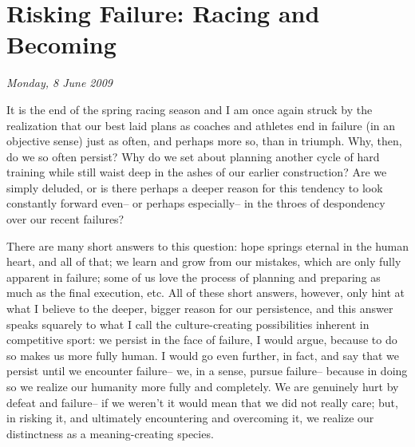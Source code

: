 \chapter{Risking Failure: Racing and Becoming}
\textit{Monday, 8 June 2009}
\bigskip

It is the end of the spring racing season and I am once again struck by the realization that our best laid plans as coaches and athletes end in failure (in an objective sense) just as often, and perhaps more so, than in triumph. Why, then, do we so often persist? Why do we set about planning another cycle of hard training while still waist deep in the ashes of our earlier construction? Are we simply deluded, or is there perhaps a deeper reason for this tendency to look constantly forward even-- or perhaps especially-- in the throes of despondency over our recent failures?

There are many short answers to this question: hope springs eternal in the human heart, and all of that; we learn and grow from our mistakes, which are only fully apparent in failure; some of us love the process of planning and preparing as much as the final execution, etc. All of these short answers, however, only hint at what I believe to the deeper, bigger reason for our persistence, and this answer speaks squarely to what I call the culture-creating possibilities inherent in competitive sport: we persist in the face of failure, I would argue, because to do so makes us more fully human. I would go even further, in fact, and say that we persist until we encounter failure-- we, in a sense, pursue failure-- because in doing so we realize our humanity more fully and completely. We are genuinely hurt by defeat and failure-- if we weren't it would mean that we did not really care; but, in risking it, and ultimately encountering and overcoming it, we realize our distinctness as a meaning-creating species.

